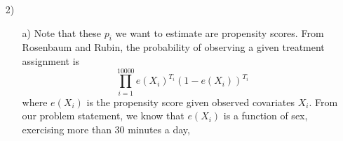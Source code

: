 \documentclass{article}
\newcommand\independent{\protect\mathpalette{\protect\independenT}{\perp}}
\def\independenT#1#2{\mathrel{\rlap{$#1#2$}\mkern2mu{#1#2}}}
\begin{document}
\begin{itemize}
  \item[2)]
    \begin{itemize}
    \item[a)]
      Note that these $p_i$ we want to estimate are
      propensity scores.
      From Rosenbaum and Rubin, 
      the probability of observing a given treatment assignment is
      $$
        \prod_{i=1}^{10000} e(X_i)^{T_i}(1-e(X_i))^{T_i}
      $$
      where $e(X_i)$ is the propensity score given observed covariates $X_i$.
      From our problem statement, we know that $e(X_i)$ is a function
      of sex, exercising more than 30 minutes a day, 

\end{itemize}
\end{itemize}
\end{document}
